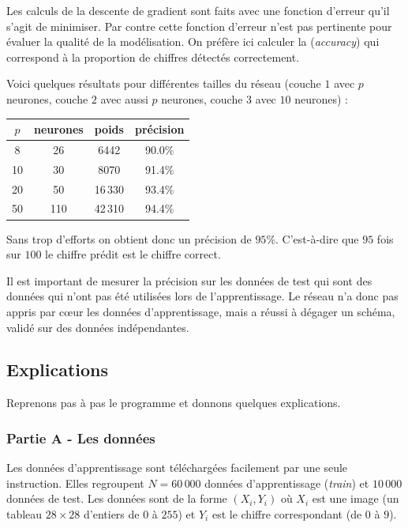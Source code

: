 \documentclass[11pt,class=report,crop=false]{standalone}
\begin{document}
Les calculs de la descente de gradient sont faits avec une fonction d'erreur qu'il s'agit de minimiser. Par contre cette fonction d'erreur n'est pas pertinente pour évaluer la qualité de la modélisation. On préfère ici calculer la  (\emph{accuracy}) qui correspond à la proportion de chiffres détectés correctement.

Voici quelques résultats pour différentes tailles du réseau (couche $1$ avec $p$ neurones, couche $2$ avec aussi $p$ neurones, couche $3$ avec $10$ neurones) :
\begin{center}
\begin{tabular}{c|c|c|c}
$p$ & {neurones} & {poids} & {précision} \\ \hline
8 & 26 & 6442 & 90.0\% \\
10 & 30 & 8070 & 91.4\% \\
20 & 50 & 16\,330 & 93.4\% \\
50 & 110 & 42\,310 & 94.4\% \\
\end{tabular}
\end{center}
Sans trop d'efforts on obtient donc un précision de $95\%$. C'est-à-dire que $95$ fois sur $100$ le chiffre prédit est le chiffre correct.

Il est important de mesurer la précision sur les données de test qui sont des données qui n'ont pas été utilisées lors de l'apprentissage. 
Le réseau n'a donc pas appris par c\oe ur les données d'apprentissage, mais a réussi à dégager un schéma, validé sur des données indépendantes.

\subsection{Explications}

Reprenons pas à pas le programme et donnons quelques explications.

\subsubsection*{Partie A - Les données}

Les données d'apprentissage sont téléchargées facilement par une seule instruction. Elles regroupent $N=60\,000$ données d'apprentissage (\emph{train}) et $10\,000$ données de test. Les données sont de la forme $(X_i,Y_i)$ où $X_i$ est une image (un tableau $28\times 28$ d'entiers de $0$ à $255$) et $Y_i$ est le chiffre correspondant (de $0$ à $9$).
\end{document}
